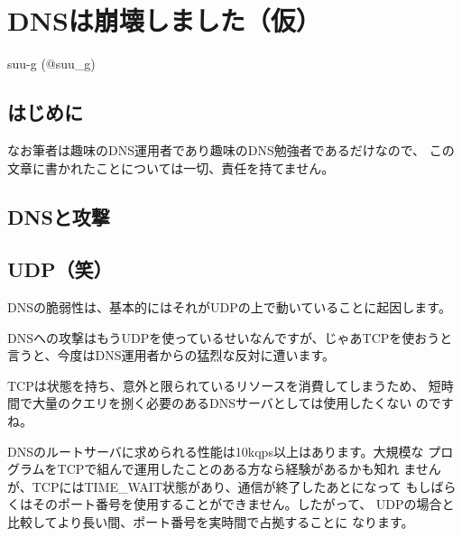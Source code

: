 
\chapter{DNSは崩壊しました（仮）}

\begin{flushright}
 suu-g (@suu\_g)
\end{flushright}

\section{はじめに}


なお筆者は趣味のDNS運用者であり趣味のDNS勉強者であるだけなので、
この文章に書かれたことについては一切、責任を持てません。

\section{DNSと攻撃}


\section{UDP（笑）}
DNSの脆弱性は、基本的にはそれがUDPの上で動いていることに起因します。



DNSへの攻撃はもうUDPを使っているせいなんですが、じゃあTCPを使おうと
言うと、今度はDNS運用者からの猛烈な反対に遭います。

TCPは状態を持ち、意外と限られているリソースを消費してしまうため、
短時間で大量のクエリを捌く必要のあるDNSサーバとしては使用したくない
のですね。

DNSのルートサーバに求められる性能は10kqps以上はあります。大規模な
プログラムをTCPで組んで運用したことのある方なら経験があるかも知れ
ませんが、TCPにはTIME\_WAIT状態があり、通信が終了したあとになって
もしばらくはそのポート番号を使用することができません。したがって、
UDPの場合と比較してより長い間、ポート番号を実時間で占拠することに
なります。

